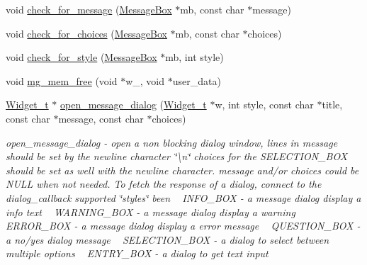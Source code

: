 \begin{DoxyCompactItemize}
\item 
void \hyperlink{xmessage-dialog_8c_a77d321e078024c048fd3f96ace5f85fa}{check\+\_\+for\+\_\+message} (\hyperlink{structMessageBox}{Message\+Box} $\ast$mb, const char $\ast$message)
\item 
void \hyperlink{xmessage-dialog_8c_ac7c2f9d8b2261cb57aa5ed09c79bb3b3}{check\+\_\+for\+\_\+choices} (\hyperlink{structMessageBox}{Message\+Box} $\ast$mb, const char $\ast$choices)
\item 
void \hyperlink{xmessage-dialog_8c_a5e65d7d3b1a5cecf8e1b63e4658fc74f}{check\+\_\+for\+\_\+style} (\hyperlink{structMessageBox}{Message\+Box} $\ast$mb, int style)
\item 
void \hyperlink{xmessage-dialog_8c_ab11fa13d22a3d275da2d78458fef8696}{mg\+\_\+mem\+\_\+free} (void $\ast$w\+\_\+, void $\ast$user\+\_\+data)
\item 
\hyperlink{structWidget__t}{Widget\+\_\+t} $\ast$ \hyperlink{xmessage-dialog_8c_a41a7ea2ce1732b9afbd1923f68b1d356}{open\+\_\+message\+\_\+dialog} (\hyperlink{structWidget__t}{Widget\+\_\+t} $\ast$w, int style, const char $\ast$title, const char $\ast$message, const char $\ast$choices)
\begin{DoxyCompactList}\small\item\em open\+\_\+message\+\_\+dialog -\/ open a non blocking dialog window, lines in message should be set by the newline character \char`\"{}\textbackslash{}n\char`\"{} choices for the S\+E\+L\+E\+C\+T\+I\+O\+N\+\_\+\+B\+OX should be set as well with the newline character. message and/or choices could be N\+U\+LL when not needed. To fetch the response of a dialog, connect to the dialog\+\_\+callback supported \char`\"{}styles\char`\"{} been ~\newline
I\+N\+F\+O\+\_\+\+B\+OX -\/ a message dialog display a info text ~\newline
W\+A\+R\+N\+I\+N\+G\+\_\+\+B\+OX -\/ a message dialog display a warning ~\newline
E\+R\+R\+O\+R\+\_\+\+B\+OX -\/ a message dialog display a error message ~\newline
Q\+U\+E\+S\+T\+I\+O\+N\+\_\+\+B\+OX -\/ a no/yes dialog message ~\newline
S\+E\+L\+E\+C\+T\+I\+O\+N\+\_\+\+B\+OX -\/ a dialog to select between multiple options ~\newline
E\+N\+T\+R\+Y\+\_\+\+B\+OX -\/ a dialog to get text input \end{DoxyCompactList}\end{DoxyCompactItemize}


